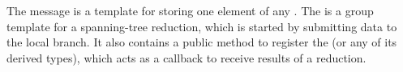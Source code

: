 The  message is a template for storing one element of any
. The  is a group template for a spanning-tree reduction,
which is started by submitting data to the local branch. It also contains a
public method to register the  (or any of its derived
types), which acts as a callback to receive results of a reduction.
